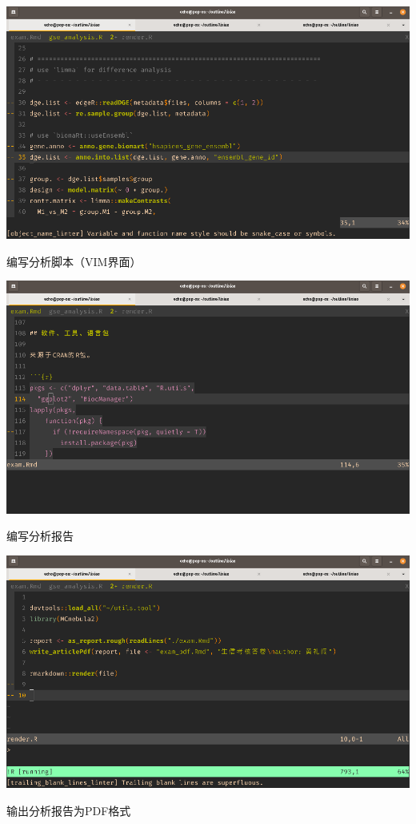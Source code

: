 \documentclass[
]{article}
\begin{document}
\bgroup {}
\includegraphics[width=13.89in]{thesis_fig/writeScript_capture} \caption{编写分析脚本（VIM界面）}\label{fig:fig12}
\makeatletter \egroup

\bgroup {}
\includegraphics[width=13.89in]{thesis_fig/writeReport_capture} \caption{编写分析报告}\label{fig:fig13}
\makeatletter \egroup

\bgroup {}
\includegraphics[width=13.89in]{thesis_fig/outputReport_capture} \caption{输出分析报告为PDF格式}\label{fig:fig14}
\makeatletter \egroup
\end{document}

